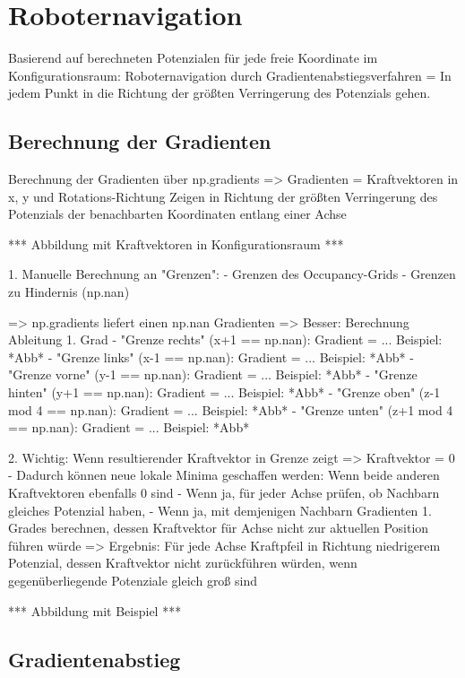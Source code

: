 \chapter{Roboternavigation}

Basierend auf berechneten Potenzialen für jede freie Koordinate im Konfigurationsraum: Roboternavigation durch Gradientenabstiegsverfahren = In jedem Punkt in die Richtung der größten Verringerung des Potenzials gehen.

\section{Berechnung der Gradienten}

Berechnung der Gradienten über np.gradients => Gradienten = Kraftvektoren in x, y und Rotations-Richtung
Zeigen in Richtung der größten Verringerung des Potenzials der benachbarten Koordinaten entlang einer Achse

*** Abbildung mit Kraftvektoren in Konfigurationsraum ***

1. Manuelle Berechnung an "Grenzen":
	- Grenzen des Occupancy-Grids
	- Grenzen zu Hindernis (np.nan)
	
	=> np.gradients liefert einen np.nan Gradienten
	=> Besser: Berechnung Ableitung 1. Grad
	- "Grenze rechts" (x+1 == np.nan): Gradient = ... Beispiel: *Abb*
	- "Grenze links" (x-1 == np.nan): Gradient = ... Beispiel: *Abb*
	- "Grenze vorne" (y-1 == np.nan): Gradient = ... Beispiel: *Abb*
	- "Grenze hinten" (y+1 == np.nan): Gradient = ... Beispiel: *Abb*
	- "Grenze oben" (z-1 mod 4 == np.nan): Gradient = ... Beispiel: *Abb*
	- "Grenze unten" (z+1 mod 4 == np.nan): Gradient = ... Beispiel: *Abb*

2. Wichtig: Wenn resultierender Kraftvektor in Grenze zeigt => Kraftvektor = 0
		- Dadurch können neue lokale Minima geschaffen werden: Wenn beide anderen Kraftvektoren ebenfalls 0 sind 
		- Wenn ja, für jeder Achse prüfen, ob Nachbarn gleiches Potenzial haben,
		- Wenn ja, mit demjenigen Nachbarn Gradienten 1. Grades berechnen, dessen Kraftvektor für Achse nicht zur aktuellen Position führen würde
		=> Ergebnis: Für jede Achse Kraftpfeil in Richtung niedrigerem Potenzial, dessen Kraftvektor nicht zurückführen würden, wenn gegenüberliegende Potenziale gleich groß sind

*** Abbildung mit Beispiel ***


\section{Gradientenabstieg}

